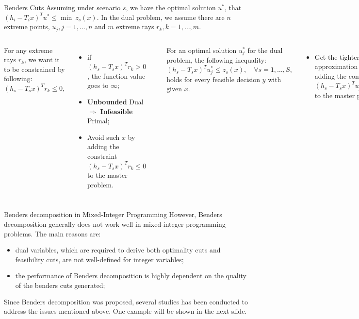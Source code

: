 \documentclass[aspectratio=169]{beamer}
\begin{document}
\begin{frame}{Benders Cuts}
Assuming under scenario $s$, we have the optimal solution $u^*$, that $(h_i - T_i x)^T u^* \leq \min ~z_s(x)$.  In the dual problem, we assume there are $n$ extreme points, $u_j, j = 1,\dots,n$ and $m$ extreme rays $r_k, k = 1,\dots,m$.
\vspace{1em}
\begin{columns}[c]

    For any extreme rays $r_k$, we want it to be constrained by following:
    \begin{equation*}
        (h_s - T_s x)^T r_k \leq 0,
    \end{equation*}
    \begin{itemize}[label=$\diamond$]
    \item if $(h_s - T_s x)^T r_k > 0$, the function value goes to $\infty$;
    \item \textbf{Unbounded} Dual $\Rightarrow$ \textbf{Infeasible} Primal;
    \item Avoid such $x$ by adding the constraint $(h_s - T_s x)^T r_k \leq 0$ to the master problem.
    \end{itemize}
    
        \rule{.1mm}{0.6\textheight}
    
    For an optimal solution $u^*_j$ for the dual problem, the following inequality:
    \begin{equation*}
        (h_s - T_s x)^T u^*_j \leq z_s(x), \quad \forall s = 1,\dots,S,
    \end{equation*}
    holds for every feasible decision $y$ with given $x$.
    \begin{itemize}[label=$\diamond$]
        \item Get the tighter lower approximation by keep adding the constraint $(h_s - T_s x)^T u^*_j \leq z_s(x)$ to the master problem
    \end{itemize}
\end{columns}  
\end{frame}

\begin{frame}{Benders decomposition in Mixed-Integer Programming}
However, Benders decomposition generally does not work well in mixed-integer programming problems. The main reasons are:
\begin{itemize}[label=$\star$]
    \item dual variables, which are required to derive both optimality cuts and feasibility cuts, are not well-defined for integer variables;
    \item the performance of Benders decomposition is highly dependent on the quality of the benders cuts generated;
\end{itemize}
Since Benders decomposition was proposed, several studies has been conducted to address the issues mentioned above. One example will be shown in the next slide.
\end{frame}
\end{document}
